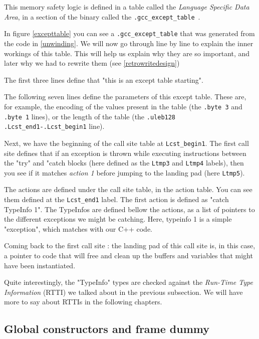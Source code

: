 \documentclass[a4paper,11pt,oneside]{report}
\begin{document}
This memory safety logic is defined in a table called the \emph{Language
Specific Data Area}, in a section of the binary called the
\texttt{.gcc\_except\_table}~\cite{airsexcepttable}.

In figure \autoref{excepttable} you can see a \texttt{.gcc\_except\_table} that 
was generated from the code in \autoref{unwinding}. We will now go through line
by line to explain the inner workings of this table.
This will help us explain why they are so important, and later why we had to
rewrite them (see \autoref{retrowritedesign})

The first three lines define that "this is an except table starting".

The following seven lines define the parameters of this except table.
These are, for example, the encoding of the values present in the table (the
\texttt{.byte 3} and \texttt{.byte 1} lines), or the length of the table (the
\texttt{.uleb128 .Lcst\_end1-.Lcst\_begin1} line).

Next, we have the beginning of the call site table at \texttt{Lcst\_begin1}.
The first call site defines that if an exception is thrown while executing
instructions between the "try" and "catch blocks (here defined as the
\texttt{Ltmp3} and \texttt{Ltmp4} labels), then you see if it matches
\emph{action 1} before jumping to the landing pad (here \texttt{Ltmp5}).

The actions are defined under the call site table, in the action table. You
can see them defined at the \texttt{Lcst\_end1} label.
The first action is defined as "catch TypeInfo 1". The TypeInfos are defined
bellow the actions, as a list of pointers to the different exceptions we might
be catching. Here, typeinfo 1 is a simple "exception", which matches with our
C++ code.

Coming back to the first call site : the landing pad of this call site is, in
this case, a pointer to code that will free and clean up the buffers and
variables that might have been instantiated.

Quite interestingly, the "TypeInfo" types are checked against the
\emph{Run-Time Type Information} (RTTI) we talked about in the previous
subsection.
We will have more to say about RTTIs in the following chapters.

\subsection{Global constructors and frame dummy}
\label{framedummy}
\end{document}
